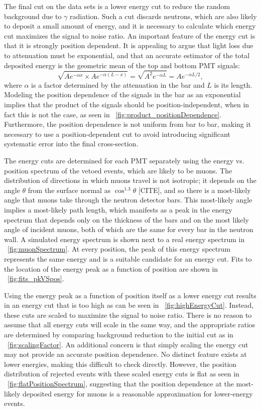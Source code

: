 The final cut on the data sets is a lower energy cut to reduce the random background due to $\gamma$ radiation.  Such a cut discards neutrons, which are also likely to deposit a small amount of energy, and it is necessary to calculate which energy cut maximizes the signal to noise ratio.  An important feature of the energy cut is that it is strongly position dependent.  It is appealing to argue that light loss due to attenuation must be exponential, and that an accurate estimator of the total deposited energy is the geometric mean of the top and bottom PMT signals:
\begin{equation}
\sqrt{Ae^{-\alpha x}\times Ae^{-\alpha (L-x)}} = \sqrt{A^2e^{-\alpha L}} = Ae^{-\alpha L/2},
\end{equation}
where $\alpha$ is a factor determined by the attenuation in the bar and $L$ is its length.  Modeling the position dependence of the signals in the bar as an exponential implies that the product of the signals should be position-independent, when in fact this is not the case, as seen in {\fig}~\ref{fig:product_positionDependence}.  Furthermore, the position dependence is not uniform from bar to bar, making it necessary to use a position-dependent cut to avoid introducing significant systematic error into the final cross-section.

The energy cuts are determined for each PMT separately using the energy vs. position spectrum of the vetoed events, which are likely to be muons.  The distribution of directions in which muons travel is not isotropic; it depends on the angle $\theta$ from the surface normal as $\cos^{1.3}{\theta}$ [CITE], and so there is a most-likely angle that muons take through the neutron detector bars.  This most-likely angle implies a most-likely path length, which manifests as a peak in the energy spectrum that depends only on the thickness of the bars and on the most likely angle of incident muons, both of which are the same for every bar in the neutron wall.  A simulated energy spectrum is shown next to a real energy spectrum in {\fig}~\ref{fig:muonSpectrum}.  At every position, the peak of this energy spectrum represents the same energy and is a suitable candidate for an energy cut.  Fits to the location of the energy peak as a function of position are shown in {\fig}~\ref{fig:fits_pkVSpos}.

Using the energy peak as a function of position itself as a lower energy cut results in an energy cut that is too high as can be seen in {\fig}~\ref{fig:highEnergyCut}.  Instead, these cuts are scaled to maximize the signal to noise ratio.  There is no reason to assume that all energy cuts will scale in the same way, and the appropriate ratios are determined by comparing background reduction to the initial cut as in {\fig}~\ref{fig:scalingFactor}.  An additional concern is that simply scaling the energy cut may not provide an accurate position dependence.  No distinct feature exists at lower energies, making this difficult to check directly.  However, the position distribution of rejected events with these scaled energy cuts is flat as seen in {\fig}~\ref{fig:flatPositionSpectrum}, suggesting that the position dependence at the most-likely deposited energy for muons is a reasonable approximation for lower-energy events.

